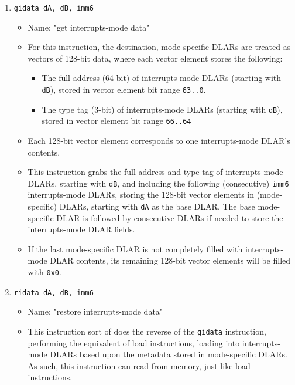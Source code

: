\documentclass{article}
\begin{document}
\begin{itemize}
\begin{enumerate}
			\item \texttt{gidata dA, dB, imm6}
				\begin{itemize}
				\item Name:  "get interrupts-mode data"
				\item For this instruction, the destination, mode-specific
					DLARs are treated as vectors of 128-bit data, where
					each vector element stores the following:
					\begin{itemize}
					\item The full address (64-bit) of interrupts-mode
						DLARs (starting with \texttt{dB}), stored in vector
						element bit range \texttt{63..0}.
					\item The type tag (3-bit) of interrupts-mode DLARs
						(starting with \texttt{dB}), stored in vector
						element bit range \texttt{66..64}
					\end{itemize}
				\item Each 128-bit vector element corresponds to one
					interrupts-mode DLAR's contents.
				\item This instruction grabs the full address and type tag
					of interrupts-mode DLARs, starting with \texttt{dB},
					and including the following (consecutive) \texttt{imm6}
					interrupts-mode DLARs, storing the 128-bit vector
					elements in (mode-specific) DLARs, starting with
					\texttt{dA} as the base DLAR.  The base mode-specific
					DLAR is followed by consecutive DLARs if needed to
					store the interrupts-mode DLAR fields.
				\item If the last mode-specific DLAR is not completely
					filled with interrupts-mode DLAR contents, its
					remaining 128-bit vector elements will be filled with
					\texttt{0x0}.
				\end{itemize}
			\item \texttt{ridata dA, dB, imm6}
				\begin{itemize}
				\item Name:  "restore interrupts-mode data"
				\item This instruction sort of does the reverse of the
					\texttt{gidata} instruction, performing the equivalent
					of load instructions, loading into interrupts-mode DLARs
					based upon the metadata stored in mode-specific DLARs.
					As such, this instruction can read from memory, just
					like load instructions.
				\end{itemize}


\end{enumerate}
\end{itemize}
\end{document}
